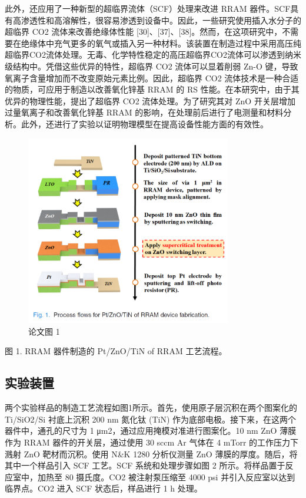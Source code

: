 此外，还应用了一种新型的超临界流体（SCF）处理来改进 RRAM 器件。SCF具有高渗透性和高溶解性，很容易渗透到设备中。因此，一些研究使用插入水分子的超临界 CO2 流体来改善绝缘体性能 [30]、[37]、[38]。然而，在这项研究中，不需要在绝缘体中充气更多的氧气或插入另一种材料。该装置在制造过程中采用高压纯超临界CO2流体处理。无毒、化学特性稳定的高压超临界CO2流体可以渗透到纳米级结构中。凭借这些优异的特性，超临界 CO2 流体可以显着削弱 Zn-O 键，导致氧离子含量增加而不改变原始元素比例。因此，超临界 CO2 流体技术是一种合适的物质，可应用于制造以改善氧化锌基 RRAM 的 RS 性能。在本研究中，由于其优异的物理性能，提出了超临界 CO2 流体处理。为了研究其对 ZnO 开关层增加过量氧离子和改善氧化锌基 RRAM 的影响，在处理前后进行了电测量和材料分析。此外，还进行了实验以证明物理模型在提高设备性能方面的有效性。


\begin{figure}[htb]
\centering 
\includegraphics[width=0.80\textwidth]{img/c1m1.png} 
\caption{论文图 1}
\label{Test}
\end{figure}

图 1. RRAM 器件制造的 Pt/ZnO/TiN of RRAM 工艺流程。

\subsection{实验装置}

两个实验样品的制造工艺流程如图1所示。首先，使用原子层沉积在两个图案化的 Ti/SiO2/Si 衬底上沉积 200 nm 氮化钛 (TiN) 作为底部电极。接下来，在这两个器件中，通孔的尺寸为 1 μm2，通过应用掩模对准进行图案化。10 nm ZnO 薄膜作为 RRAM 器件的开关层，通过使用 30 sccm Ar 气体在 4 mTorr 的工作压力下溅射 ZnO 靶材而沉积。使用 N\&K 1280 分析仪测量 ZnO 薄膜的厚度。随后，将其中一个样品引入 SCF 工艺。SCF 系统和处理步骤如图 2 所示。将样品置于反应室中，加热至 80 摄氏度。CO2 被注射泵压缩至 4000 psi 并引入反应室以达到临界点。CO2 进入 SCF 状态后，样品进行 1 h 处理。


